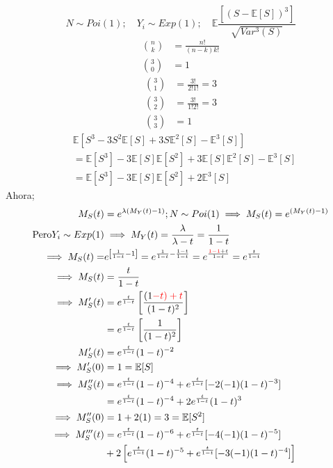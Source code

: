\documentclass[
]{article}
\begin{document}
\[ N \sim Poi(1); \quad Y_{i} \sim Exp(1); \quad \mathbb{E}\frac{[(S - \mathbb{E}[S])^{3}]}{\sqrt{Var^{3}(S)}} \]
\begin{align*}
\binom{n}{k} &= \frac{n!}{(n - k)k!}\\
\binom{3}{0} &= 1
\end{align*} \begin{align*}
\binom{3}{1} &= \frac{3!}{2!1!} = 3\\
\binom{3}{2} &= \frac{3!}{1!2!} = 3\\
\binom{3}{3} &= 1
\end{align*} \begin{align*}
& \mathbb{E}[S^{3} - 3S^{2}\mathbb{E}[S] + 3S\mathbb{E}^{2}[S] - \mathbb{E}^{3}[S]]\\
&= \mathbb{E}[S^{3}] - 3 \mathbb{E}[S]\mathbb{E}[S^{2}] + 3 \mathbb{E}[S]\mathbb{E}^{2}[S] - \mathbb{E}^{3}[S]\\
&= \mathbb{E}[S^{3}] - 3 \mathbb{E}[S]\mathbb{E}[S^{2}] + 2 \mathbb{E}^{3}[S]
\end{align*} Ahora; \begin{align*}
M_{S}(t) &= e^{\lambda(M_{Y}(t) - 1)}; N \sim Poi(1) \implies M_{S}(t) = e^{(M_{Y}(t) - 1)}\\
\text{Pero} Y_{i} \sim Exp(1) &\implies M_{Y}(t) = \frac{\lambda}{\lambda - t} = \frac{1}{1 - t}\\
\implies M_{S}(t) =& e^{\left[\frac{1}{1 - t} - 1\right]} = e^{\frac{1}{1 - t} - \frac{1 - t}{1 - t}} = e^{\frac{\textcolor{red}{1-1} + t}{1 - t}} = e^{\frac{t}{1 - t}}\\
\implies M_{S}(t) &= \frac{t}{1 - t}\\
\implies M'_{S}(t) &= e^{\frac{t}{1 - t}}\left[\frac{(1 \textcolor{red}{- t) + t}}{(1 - t)^{2}}\right]\\
&= e^{\frac{t}{1 - t}}\left[\frac{1}{(1 - t)^{2}}\right]\\
M'_{S}(t) &= e^{\frac{t}{1 - t}}(1 - t)^{-2}\\
\implies M'_{S}(0) &= 1 = \mathbb{E}[S]\\
\implies M''_{S}(t) &= e^{\frac{t}{1 - t}}(1 - t)^{-4} + e^{\frac{t}{1 - t}}[-2(-1)(1 - t)^{-3}]\\
&= e^{\frac{t}{1 - t}}(1 - t)^{-4} + 2e^{\frac{t}{1 - t}}(1 - t)^{3}\\
\implies M''_{S}(0) &= 1 + 2(1) = 3 = \mathbb{E}[S^{2}]\\
\implies M'''_{S}(t) &= e^{\frac{t}{1 - t}} (1 - t)^{-6} + e^{\frac{t}{1 - t}}[-4(-1)(1 - t)^{-5}]\\
&+ 2 \left[e^{\frac{t}{1 - t}}(1 - t)^{-5} + e^{\frac{t}{1 - t}}[-3(-1)(1 - t)^{-4}]\right]\\

\end{align*}
\end{document}
